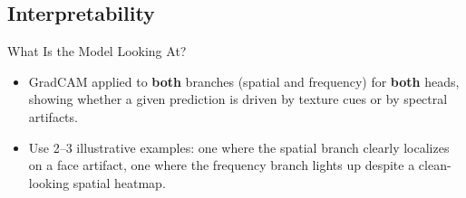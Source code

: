 \subsection{Interpretability}

\begin{frame}{What Is the Model Looking At?}
  \begin{itemize}
    \item GradCAM applied to \textbf{both} branches (spatial and frequency) for \textbf{both} heads, showing whether a given prediction is driven by texture cues or by spectral artifacts.
    \item Use 2--3 illustrative examples: one where the spatial branch clearly localizes on a face artifact, one where the frequency branch lights up despite a clean-looking spatial heatmap.
  \end{itemize}

\end{frame}

